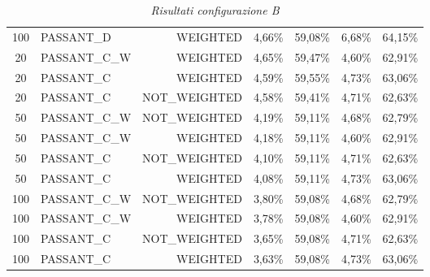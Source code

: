 \begin{table}[H]
{\begin{tabular}{ c l r c c c c }
			100 &  PASSANT\_D &   WEIGHTED &     4,66\% &    59,08\% &     6,68\% &    64,15\% \\
			
			20 & PASSANT\_C\_W &   WEIGHTED &     4,65\% &    59,47\% &     4,60\% &    62,91\% \\
			
			20 &  PASSANT\_C &   WEIGHTED &     4,59\% &    59,55\% &     4,73\% &    63,06\% \\
			
			20 &  PASSANT\_C & NOT\_WEIGHTED &     4,58\% &    59,41\% &     4,71\% &    62,63\% \\
			
			50 & PASSANT\_C\_W & NOT\_WEIGHTED &     4,19\% &    59,11\% &     4,68\% &    62,79\% \\
			
			50 & PASSANT\_C\_W &   WEIGHTED &     4,18\% &    59,11\% &     4,60\% &    62,91\% \\
			
			50 &  PASSANT\_C & NOT\_WEIGHTED &     4,10\% &    59,11\% &     4,71\% &    62,63\% \\
			
			50 &  PASSANT\_C &   WEIGHTED &     4,08\% &    59,11\% &     4,73\% &    63,06\% \\
			
			100 & PASSANT\_C\_W & NOT\_WEIGHTED &     3,80\% &    59,08\% &     4,68\% &    62,79\% \\
			
			100 & PASSANT\_C\_W &   WEIGHTED &     3,78\% &    59,08\% &     4,60\% &    62,91\% \\
			
			100 &  PASSANT\_C & NOT\_WEIGHTED &     3,65\% &    59,08\% &     4,71\% &    62,63\% \\
			
			100 &  PASSANT\_C &   WEIGHTED &     3,63\% &    59,08\% &     4,73\% &    63,06\% \\
			\bottomrule
		\end{tabular}  
}
	\caption{\emph{Risultati configurazione B}}
\end{table}

